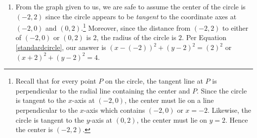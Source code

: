 \documentclass{ximera}
\begin{document}
\begin{example}
\begin{explanation}
\begin{enumerate}
\begin{enumerate}
\begin{center}
\end{center}

The task before us is to analytically follow these steps to find our answer. 

First, note that since the given points are endpoints of a diameter, we know their midpoint $(h, k)$ is the center of the circle.  Using Equations \ref{midpointformula}, we find the center of the circle below.


\[\begin{array}{rcl} (h,k) &  = & \left( \frac{x_0 + x_1}{2},  \frac{y_0 + y_1}{2} \right) \\  
&  = &  \left( \frac{-1+2}{2},  \frac{3+4}{2} \right) \\  
& = &  \left( \frac{1}{2},  \frac{7}{2} \right)   \\  \end{array}\]


 Likewise, the diameter of the circle is the distance between the given points, so we can find the radius of the circle by taking half of this distance.  Using \ref{distanceformula}, we get:
 
\[\begin{array}{rcl} r &  = & \frac{1}{2} \sqrt{\left(x_1 - x_0\right)^2+\left(y_1-y_0\right)^2}  \\  
 &  = & \frac{1}{2} \sqrt{(2-(-1))^2+(4-3)^2} \\  
 & = & \frac{1}{2} \sqrt{3^2+1^2} \\  
 & = &\frac{\sqrt{10}}{2} \end{array}\]
 


Finally, since $\left( \frac{\sqrt{10}}{2} \right)^2 = \frac{10}{4} = \frac{5}{2}$, our answer becomes $\left(x - \frac{1}{2} \right)^2 + \left(y - \frac{7}{2} \right)^2 =\frac{5}{2}$



\item  From the graph given to us, we are safe to assume the center of the circle is $(-2,2)$ since the circle appears to be \textit{tangent} to the coordinate axes at $(-2,0)$ and $(0,2)$.\footnote{Recall that for every point $P$ on the circle, the tangent line at $P$ is perpendicular to the radial line containing the center and $P$. Since the circle is tangent to the $x$-axis at $(-2,0)$, the center must lie on a line perpendicular to the $x$-axis which contains $(-2,0)$ or $x = -2$.  Likewise,  the circle is tangent to the $y$-axis at $(0,2)$,  the center must lie on $y=2$.  Hence the center is $(-2,2)$.}   Moreover, since the distance from $(-2,2)$ to either of $(-2,0)$ or $(0,2)$ is $2$, the radius of the circle is $2$.  Per Equation \ref{standardcircle}, our answer is $(x-(-2))^2 + (y-2)^2 = (2)^2$ or $(x+2)^2+(y-2)^2 = 4$. 

\end{enumerate}

\end{enumerate}
\end{explanation}
\end{example}
\end{document}
